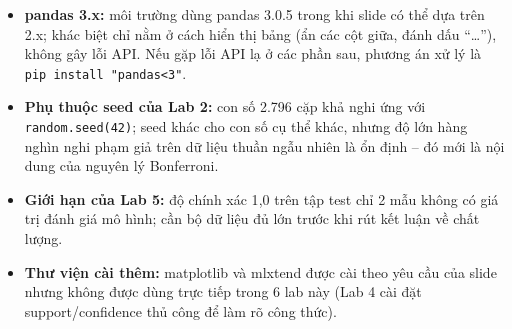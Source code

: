 \documentclass[12pt,a4paper,oneside]{article}
\begin{document}
\begin{itemize}
  \item \textbf{pandas 3.x:} môi trường dùng pandas 3.0.5 trong khi slide có thể dựa trên 2.x; khác biệt chỉ nằm ở cách hiển thị bảng (ẩn các cột giữa, đánh dấu ``\ldots''), không gây lỗi API. Nếu gặp lỗi API lạ ở các phần sau, phương án xử lý là \texttt{pip install "pandas<3"}.
  \item \textbf{Phụ thuộc seed của Lab 2:} con số 2.796 cặp khả nghi ứng với \texttt{random.seed(42)}; seed khác cho con số cụ thể khác, nhưng độ lớn hàng nghìn nghi phạm giả trên dữ liệu thuần ngẫu nhiên là ổn định -- đó mới là nội dung của nguyên lý Bonferroni.
  \item \textbf{Giới hạn của Lab 5:} độ chính xác 1{,}0 trên tập test chỉ 2 mẫu không có giá trị đánh giá mô hình; cần bộ dữ liệu đủ lớn trước khi rút kết luận về chất lượng.
  \item \textbf{Thư viện cài thêm:} matplotlib và mlxtend được cài theo yêu cầu của slide nhưng không được dùng trực tiếp trong 6 lab này (Lab 4 cài đặt support/confidence thủ công để làm rõ công thức).
\end{itemize}
\end{document}
